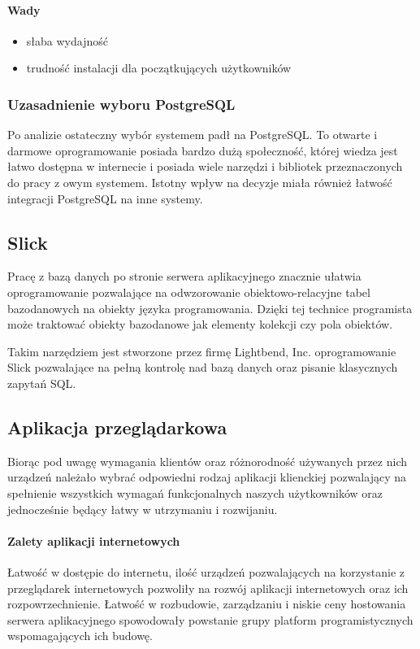 \documentclass[a4paper,12pt,twoside]{article}
\begin{document}
\paragraph{Wady}
\begin{itemize}
\item{słaba wydajność}
\item{trudność instalacji dla początkujących użytkowników}
\end{itemize}

\subsubsection{Uzasadnienie wyboru PostgreSQL}
Po analizie ostateczny wybór systemem padł na PostgreSQL.
To otwarte i darmowe oprogramowanie posiada bardzo dużą społeczność, której wiedza jest łatwo dostępna w internecie 
i posiada wiele narzędzi i bibliotek przeznaczonych do pracy z owym systemem. 
Istotny wpływ na decyzje miała również łatwość integracji PostgreSQL na inne systemy.  

\subsection{Slick}  
Pracę z bazą danych po stronie serwera aplikacyjnego 
znacznie ułatwia oprogramowanie pozwalające na odwzorowanie obiektowo-relacyjne tabel bazodanowych na obiekty języka programowania.
Dzięki tej technice programista może traktować obiekty bazodanowe jak elementy kolekcji czy pola obiektów.

Takim narzędziem jest stworzone przez firmę Lightbend, Inc. 
oprogramowanie Slick\cite{slick} pozwalające na pełną kontrolę nad bazą danych oraz pisanie klasycznych zapytań SQL.


\subsection{Aplikacja przeglądarkowa}
Biorąc pod uwagę wymagania klientów oraz różnorodność używanych przez nich urządzeń należało wybrać odpowiedni rodzaj aplikacji klienckiej pozwalający na spełnienie wszystkich wymagań funkcjonalnych naszych użytkowników 
oraz jednocześnie będący łatwy w utrzymaniu i rozwijaniu.

\paragraph{Zalety aplikacji internetowych}
Łatwość w dostępie do internetu, ilość urządzeń pozwalających na 
korzystanie z przeglądarek internetowych pozwoliły 
na rozwój aplikacji internetowych oraz ich rozpowrzechnienie.
Łatwość w rozbudowie, zarządzaniu i 
niskie ceny hostowania serwera aplikacyjnego spowodowały 
powstanie grupy platform programistycznych wspomagających ich budowę. 
\end{document}
